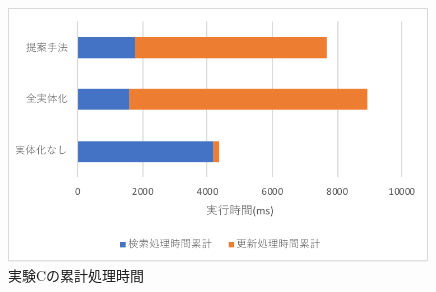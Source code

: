 \documentclass[a4paper,11pt]{ujreport}
\begin{document}
\begin{figure}[htbp]
	\begin{center}
		\includegraphics[width=30em]{src/ExperimentC-total.pdf} %
	\end{center}
	\caption{実験Cの累計処理時間}
	\label{ExperimentC-total}
\end{figure}
\end{document}

